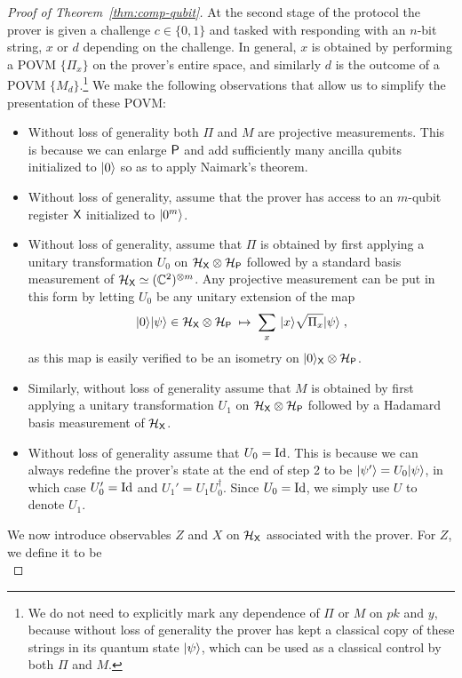 \begin{proof}[Proof of Theorem~\ref{thm:comp-qubit}]
At the second stage of the protocol the prover is given a challenge $c\in\{0,1\}$ and tasked with responding with an $n$-bit string, $x$ or $d$ depending on the challenge. In general, $x$ is obtained by performing a POVM $\{\Pi_x\}$ on the prover's entire space, and similarly $d$ is the outcome of a POVM $\{M_d\}$.\footnote{We do not need to explicitly mark any dependence of $\Pi$ or $M$ on $pk$ and $y$, because without loss of generality the prover has kept a classical copy of these strings in its quantum state $|\psi\rangle$, which can be used as a classical control by both $\Pi$ and $M$.} We make the following observations that allow us to simplify the presentation of these POVM:
\begin{itemize}
\item Without loss of generality both $\Pi$ and $M$ are projective measurements. This is because we can enlarge ${\textsf{P}}$ and add sufficiently many ancilla qubits initialized to $|0\rangle$ so as to apply Naimark's theorem. 
\item Without loss of generality, assume that the prover has access to an $m$-qubit register ${\textsf{X}}$ initialized to $|0^m\rangle$. 
\item Without loss of generality, assume that $\Pi$ is obtained by first applying a unitary transformation $U_0$ on $\mathcal{H}_{\textsf{X}} \otimes \mathcal{H}_{{\textsf{P}}}$ followed by a standard basis measurement of $\mathcal{H}_{\textsf{X}}  \simeq (\mathbb{C}^2)^{\otimes m}$. Any projective measurement can be put in this form by letting $U_0$ be any unitary extension of the map 
\[|0\rangle|\psi\rangle\in \mathcal{H}_{\textsf{X}}\otimes \mathcal{H}_{\textsf{P}}\; \mapsto\; \sum_x \,|x\rangle \sqrt{\Pi_x} |\psi\rangle\;,\]
 as this map is easily verified to be an isometry on $|0\rangle_{\textsf{X}}\otimes \mathcal{H}_{\textsf{P}}$. 
\item Similarly, without loss of generality assume that $M$ is obtained by first applying a unitary transformation $U_1$ on $\mathcal{H}_{\textsf{X}} \otimes \mathcal{H}_{{\textsf{P}}}$ followed by a Hadamard basis measurement of $\mathcal{H}_{\textsf{X}}$.
\item Without loss of generality assume that $U_0 = \mathop{\rm Id}\nolimits$. This is because we can always redefine the prover's state at the end of step 2 to be $|\psi'\rangle = U_0|\psi\rangle$, in which case $U'_0=\mathop{\rm Id}\nolimits$ and $U_1'=U_1U_0^\dagger$. Since $U_0=\mathop{\rm Id}\nolimits$, we simply use $U$ to denote $U_1$.
\end{itemize}
We now introduce observables $Z$ and $X$ on $\mathcal{H}_{\textsf{X}}$ associated with the prover. For $Z$, we define it to be 
\begin{equation}\label{eq:comp-qubit-proof-1a}

\end{equation}
\end{proof}
